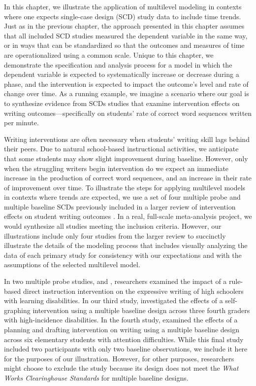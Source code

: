 \documentclass[
]{book}
\begin{document}
In this chapter, we illustrate the application of multilevel modeling in contexts where one expects single-case design (SCD) study data to include time trends. Just as in the previous chapter, the approach presented in this chapter assumes that all included SCD studies measured the dependent variable in the same way, or in ways that can be standardized so that the outcomes and measures of time are operationalized using a common scale. Unique to this chapter, we demonstrate the specification and analysis process for a model in which the dependent variable is expected to systematically increase or decrease during a phase, and the intervention is expected to impact the outcome's level and rate of change over time. As a running example, we imagine a scenario where our goal is to synthesize evidence from SCDs studies that examine intervention effects on writing outcomes---specifically on students' rate of correct word sequences written per minute.

Writing interventions are often necessary when students' writing skill lags behind their peers. Due to natural school-based instructional activities, we anticipate that some students may show slight improvement during baseline. However, only when the struggling writers begin intervention do we expect an immediate increase in the production of correct word sequences, and an increase in their rate of improvement over time. To illustrate the steps for applying multilevel models in contexts where trends are expected, we use a set of four multiple probe and multiple baseline SCDs previously included in a larger review of intervention effects on student writing outcomes \citep{datchuk2020Level}. In a real, full-scale meta-analysis project, we would synthesize all studies meeting the inclusion criteria. However, our illustrations include only four studies from the larger review to succinctly illustrate the details of the modeling process that includes visually analyzing the data of each primary study for consistency with our expectations and with the assumptions of the selected multilevel model.

In two multiple probe studies, \citet{walker2005using} and \citet{walker2007improving}, researchers examined the impact of a rule-based direct instruction intervention on the expressive writing of high schoolers with learning disabilities. In our third study, \citet{stotz2008Effects} investigated the effects of a self-graphing intervention using a multiple baseline design across three fourth graders with high-incidence disabilities. In the fourth study, \citet{lewandowski2011effects} examined the effects of a planning and drafting intervention on writing using a multiple baseline design across six elementary students with attention difficulties. While this final study included two participants with only two baseline observations, we include it here for the purposes of our illustration. However, for other purposes, researchers might choose to exclude the \citet{lewandowski2011effects} study because its design does not meet the \emph{What Works Clearinghouse Standards} \citeyearpar{WWC2022} for multiple baseline designs.
\end{document}
